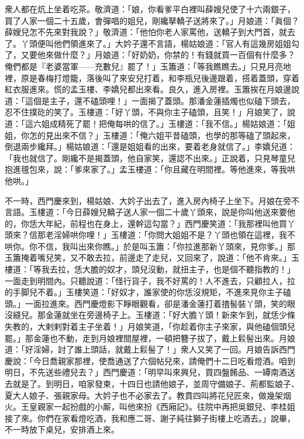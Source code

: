 衆人都在炕上坐着吃茶。敬濟道：「娘，你看爹平白裡叫薛嫂兒使了十六兩銀子，買了人家一個二十五歲，會彈唱的姐兒，剛纔拏轎子送將來了。」月娘道：「眞個？薛嫂兒怎不先來對我說？」敬濟道：「他怕你老人家罵他，送轎子到大門首，就去了。丫頭便叫他們領進來了。」大妗子還不言語，楊姑娘道：「官人有這幾房姐姐勾了，又要他來做什麼？」月娘道：「好奶奶，你禁的！有錢就買一百個有什麼多？俺們都是『老婆當軍——充數兒』罷了！」{}玉簫道：「等我瞧瞧去。」只見月亮地裡，原是春梅打燈籠，落後叫了來安兒打着，和李瓶兒後邊跟着，搭着蓋頭，穿着紅衣服進來。慌的孟玉樓、李嬌兒都出來看。{}良久，進入房裡。玉簫挨在月娘邊說道：「這個是主子，還不磕頭哩！」一面揭了蓋頭。那潘金蓮插燭也似磕下頭去，忍不住撲矻的笑了。玉樓道：「好丫頭，不與你主子磕頭，且笑！」月娘笑了，說道：「這六姐成精死了罷！把俺每哄的信了。」玉樓道：「我不信。」{}楊姑娘道：「姐姐，你怎的見出來不信？」玉樓道：「俺六姐平昔磕頭，也學的那等磕了頭起來，倒退兩步纔拜。」楊姑娘道：「還是姐姐看的出來，要着老身就信了。」李嬌兒道：「我也就信了。剛纔不是揭蓋頭，他自家笑，還認不出來。」{}正說着，只見琴童兒抱進氊包來，說：「爹來家了。」孟玉樓道：「你且藏在明間裡。等他進來，等我哄他哄。」

不一時，西門慶來到，楊姑娘、大妗子出去了，進入房內椅子上坐下。月娘在旁不言語。玉樓道：「今日薛嫂兒轎子送人家一個二十歲丫頭來，說是你叫他送來要他的，你恁大年紀，前程也在身上，還幹這勾當？」西門慶笑道：「我那裡叫他買丫頭來？信那老淫婦哄你哩！」玉樓道：「你問大姐姐不是？丫頭也領在這裡，我不哄你。你不信，我叫出來你瞧。」於是叫玉簫：「你拉進那新丫頭來，見你爹。」那玉簫掩着嘴兒笑，又不敢去拉，前邊走了走兒，又回來了，說道：「他不肯來。」玉樓道：「等我去拉，恁大膽的奴才，頭兒沒動，就扭主子，也是個不聽指教的！」一面走到明間內。只聽說道：「怪行貨子，我不好罵的！人不進去，只顧拉人，拉的手脚兒不着。」玉樓笑道：「好奴才，誰家使的你恁沒規矩，不進來見你主子磕頭。」一面拉進來。西門慶燈影下睜眼觀看，卻是潘金蓮打着揸髻裝丫頭，笑的眼沒縫兒。{}那金蓮就坐在旁邊椅子上。玉樓道：「好大膽丫頭！新來乍到，就恁少條失教的，大剌剌對着主子坐着！」月娘笑道，「你趁着你主子來家，與他磕個頭兒罷。」那金蓮也不動，走到月娘裡間屋裡，一頓把簪子拔了，戴上鬏髻出來。月娘道：「好淫婦，討了誰上頭話，就戴上鬏髻了！」衆人又笑了一回。月娘告訴西門慶說：「今日喬親家那裡，使喬通送了六個帖兒來，請俺們十二日吃看燈酒。咱到明日，不先送些禮兒去？」西門慶道：「明早叫來興兒，買四盤餚品、一罈南酒送去就是了。到明日，咱家發柬，十四日也請他娘子，並周守備娘子、荊都監娘子、夏大人娘子、張親家母。大妗子也不必家去了。教賁四叫將花兒匠來，做幾架烟火。王皇親家一起扮戲的小厮，叫他來扮《西廂記》。往院中再把吳銀兒、李桂姐接了來。你們在家看燈吃酒，我和應二哥、謝子純往獅子街樓上吃酒去。」說畢，不一時放下桌兒，安排酒上來。

